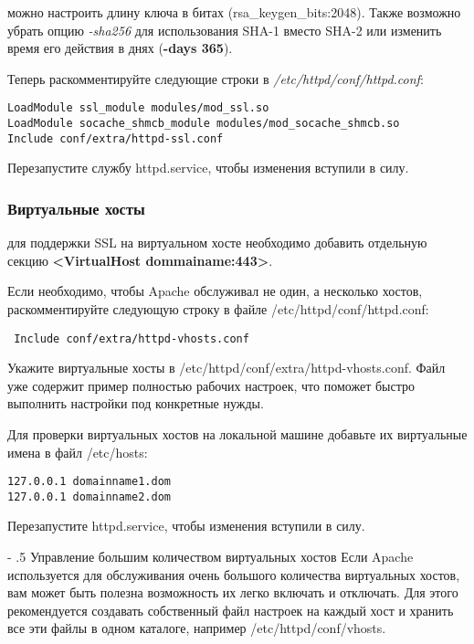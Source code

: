 \documentclass[a4paper,10pt,twoside]{article}
\makeatletter
\renewcommand\paragraph{%
   \@startsection{paragraph}{4}{0mm}%
      {-\baselineskip}%
      {.5\baselineskip}%
      {\normalfont\normalsize\bfseries}}
\makeatother
\begin{document}
 можно настроить длину ключа в битах (rsa\_keygen\_bits:2048). Также возможно убрать опцию \textit{-sha256} для использования SHA-1 вместо SHA-2 или изменить время его действия в днях (\textbf{-days 365}).

Теперь раскомментируйте следующие строки в \textit{/etc/httpd/conf/httpd.conf}:

\begin{verbatim}
LoadModule ssl_module modules/mod_ssl.so
LoadModule socache_shmcb_module modules/mod_socache_shmcb.so
Include conf/extra/httpd-ssl.conf
\end{verbatim} 

Перезапустите службу httpd.service, чтобы изменения вступили в силу.

\subsubsection{Виртуальные хосты}
 для поддержки SSL на виртуальном хосте необходимо добавить отдельную секцию \textbf{<VirtualHost dommainame:443>}. 

Если необходимо, чтобы Apache обслуживал не один, а несколько хостов, раскомментируйте следующую строку в файле /etc/httpd/conf/httpd.conf:
\begin{verbatim}
 Include conf/extra/httpd-vhosts.conf
\end{verbatim} 

Укажите виртуальные хосты в /etc/httpd/conf/extra/httpd-vhosts.conf. Файл уже содержит пример полностью рабочих настроек, что поможет быстро выполнить настройки под конкретные нужды.

Для проверки виртуальных хостов на локальной машине добавьте их виртуальные имена в файл /etc/hosts:
\begin{verbatim}
127.0.0.1 domainname1.dom 
127.0.0.1 domainname2.dom
\end{verbatim} 
Перезапустите httpd.service, чтобы изменения вступили в силу.

\paragraph{Управление большим количеством виртуальных хостов}
Если Apache используется для обслуживания очень большого количества виртуальных хостов, вам может быть полезна возможность их легко включать и отключать. Для этого рекомендуется создавать собственный файл настроек на каждый хост и хранить все эти файлы в одном каталоге, например /etc/httpd/conf/vhosts.
\end{document}
